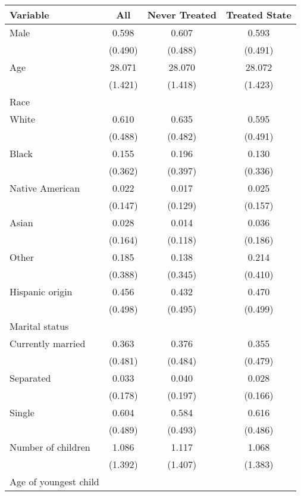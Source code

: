 \begin{tabular}{lccc}
\toprule
\toprule
 Variable & All & Never Treated & Treated State \\
\midrule 
 Male  & 0.598 & 0.607 & 0.593 \\
 & (0.490) & (0.488) & (0.491) \\
 Age  & 28.071 & 28.070 & 28.072 \\
 & (1.421) & (1.418) & (1.423) \\
 Race  & & &  \\
 \hspace{0.3cm}  White  & 0.610 & 0.635 & 0.595 \\
 & (0.488) & (0.482) & (0.491) \\
 \hspace{0.3cm}  Black  & 0.155 & 0.196 & 0.130 \\
 & (0.362) & (0.397) & (0.336) \\
 \hspace{0.3cm}  Native American  & 0.022 & 0.017 & 0.025 \\
 & (0.147) & (0.129) & (0.157) \\
 \hspace{0.3cm}  Asian  & 0.028 & 0.014 & 0.036 \\
 & (0.164) & (0.118) & (0.186) \\
 \hspace{0.3cm}  Other  & 0.185 & 0.138 & 0.214 \\
 & (0.388) & (0.345) & (0.410) \\
 Hispanic origin  & 0.456 & 0.432 & 0.470 \\
 & (0.498) & (0.495) & (0.499) \\
 Marital status  & & &  \\
 \hspace{0.3cm} Currently married  & 0.363 & 0.376 & 0.355 \\
 & (0.481) & (0.484) & (0.479) \\
 \hspace{0.3cm} Separated  & 0.033 & 0.040 & 0.028 \\
 & (0.178) & (0.197) & (0.166) \\
 \hspace{0.3cm} Single  & 0.604 & 0.584 & 0.616 \\
 & (0.489) & (0.493) & (0.486) \\
 Number of children  & 1.086 & 1.117 & 1.068 \\
 & (1.392) & (1.407) & (1.383) \\
 Age of youngest child  & & &  \\

\end{tabular}

